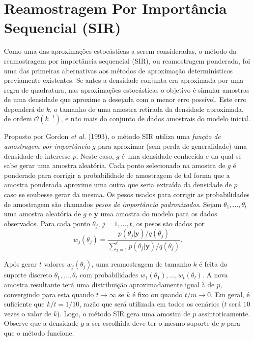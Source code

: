\section{Reamostragem Por Importância Sequencial (SIR)}\label{sir}

Como uma das aproximações estocásticas a serem consideradas, o método da reamostragem por importância sequencial (SIR), ou reamostragem ponderada, foi uma das primeiras alternativas aos métodos de aproximação determinísticos previamente existentes. Se antes a densidade conjunta era aproximada por uma regra de quadratura, nas aproximações estocásticas o objetivo é simular amostras de uma densidade que aproxime a desejada com o menor erro possível. Este erro dependerá de $k$, o tamanho de uma amostra retirada da densidade aproximada, de ordem $\mathcal{O}(k^{-1})$, e não mais do conjunto de dados amostrais do modelo inicial.

Proposto por Gordon \textit{et al.} (1993)\cite{Gordon1993}, o método SIR utiliza uma \textit{função de amostragem por importância} $g$ para aproximar (sem perda de generalidade) uma densidade de interesse $p$. Neste caso, $g$ é uma densidade conhecida e da qual se sabe gerar uma amostra aleatória. Cada ponto selecionado na amostra de $g$ é ponderado para corrigir a probabilidade de amostragem de tal forma que a amostra ponderada aproxime uma outra que seria extraída da densidade de $p$ caso se soubesse gerar da mesma. Os pesos usados para corrigir as probabilidades de amostragem são chamados \textit{pesos de importância padronizados}. Sejam $\theta_1, \ldots, \theta_t$ uma amostra aleatória de $g$ e $\bm{y}$ uma amostra do modelo para os dados observados. Para cada ponto $\theta_j$, $j = 1, \ldots, t$, os pesos são dados por
\begin{equation}\label{eq:sir_wei}
w_j(\theta_j) = \dfrac{p(\theta_j | \bm{y}) / q(\theta_j)}{\sum_{j=1}^{t} p(\theta_j | \bm{y}) / q(\theta_j)}.
\end{equation}

Após gerar $t$ valores $w_j(\theta_j)$, uma reamostragem de tamanho $k$ é feita do suporte discreto $\theta_1, \ldots, \theta_t$ com probabilidades $w_1(\theta_1), \ldots, w_t(\theta_t)$. A nova amostra resultante terá uma distribuição aproximadamente igual à de $p$, convergindo para esta quando $t \rightarrow \infty$ se $k$ é fixo ou quando $t/m \rightarrow 0$. Em geral, é suficiente que $k/t = 1/10$, razão que será utilizada em todos os cenários ($t$ será $10$ vezes o valor de $k$). Logo, o método SIR gera uma amostra de $p$ assintoticamente. Observe que a densidade $g$ a ser escolhida deve ter o mesmo suporte de $p$ para que o método funcione.


